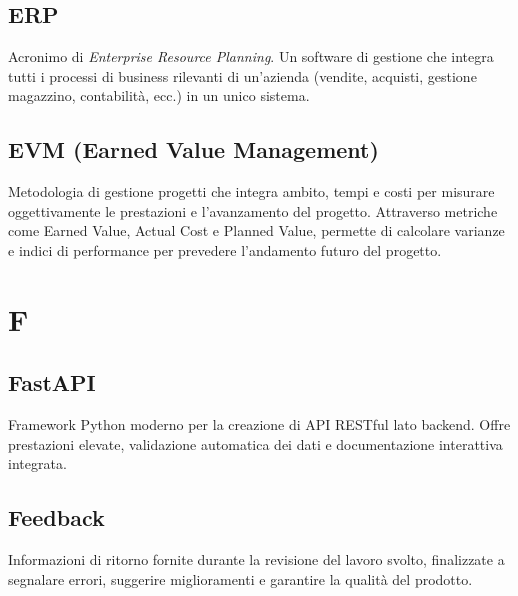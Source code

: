 \documentclass[a4paper, 11pt, oneside]{scrartcl} %
\begin{document}
\subsection*{ERP}
Acronimo di \textit{Enterprise Resource Planning}. Un software di gestione che integra tutti i processi di business rilevanti di un'azienda (vendite, acquisti, gestione magazzino, contabilità, ecc.) in un unico sistema.
\vspace{0.5cm}

\subsection*{EVM (Earned Value Management)}
Metodologia di gestione progetti che integra ambito, tempi e costi per misurare oggettivamente le prestazioni e l'avanzamento del progetto. Attraverso metriche come Earned Value, Actual Cost e Planned Value, permette di calcolare varianze e indici di performance per prevedere l'andamento futuro del progetto.
\vspace{0.5cm}


\section*{F}


\subsection*{FastAPI}


Framework Python moderno per la creazione di API RESTful lato backend. Offre prestazioni elevate, validazione automatica dei dati e documentazione interattiva integrata.

\vspace{0.5cm}

\subsection*{Feedback}


Informazioni di ritorno fornite durante la revisione del lavoro svolto, finalizzate a segnalare errori, suggerire miglioramenti e garantire la qualità del prodotto.
\end{document}

